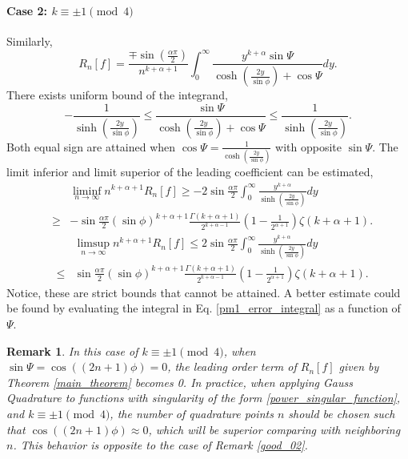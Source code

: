 \documentclass[11pt]{article}
\newtheorem{remark}{Remark}
\begin{document}
\paragraph{\bf{Case 2: $k\equiv \pm 1\pmod 4$}} Similarly,
\begin{equation}
        R_n[f] =\frac{\mp \sin(\frac{\alpha\pi}{2})}{ n^{k+\alpha+1}}  \int_{0}^{\infty}  \frac{  y^{k+\alpha} \sin \Psi }{\cosh\left(\frac{2y}{\sin\phi}\right) + \cos \Psi} dy. \label{pm1_error_integral}
\end{equation}
There exists uniform bound of the integrand,
\begin{equation}
    -\frac{1}{\sinh\left(\frac{2y}{\sin\phi}\right)} \leq \frac{ \sin \Psi }{\cosh\left(\frac{2y}{\sin\phi}\right)+\cos \Psi} \leq \frac{1}{\sinh\left(\frac{2y}{\sin\phi}\right)}.
\end{equation}
Both equal sign are attained when $\cos\Psi = \frac{1}{\cosh\left(\frac{2y}{\sin\phi}\right)}$ with opposite $\sin \Psi$. The limit inferior and limit superior of the leading coefficient can be estimated,
\begin{eqnarray}
    &&\liminf_{n \to \infty} n^{k+\alpha+1}R_n[f] \geq -2 \sin \frac{\alpha \pi}{2}  \int_0^\infty \frac{y^{k+\alpha} }{\sinh\left(\frac{2y}{\sin\phi}\right)} dy \nonumber\\
    &\geq& -\sin\frac{\alpha \pi}{2} (\sin \phi)^{k+\alpha+1}  \frac{\Gamma(k+\alpha+1)}{2^{k+\alpha-1}}(1-\frac{1}{2^{\alpha+1}}) \zeta(k+\alpha+1). \label{4lpm1_l}
\end{eqnarray}
\begin{eqnarray}
    &&\limsup_{n \to \infty} n^{k+\alpha+1}R_n[f] \leq 2 \sin \frac{\alpha \pi}{2}  \int_0^\infty \frac{y^{k+\alpha} }{\sinh\left(\frac{2y}{\sin\phi}\right)} dy \nonumber\\
    &\leq& \sin\frac{\alpha \pi}{2} (\sin \phi)^{k+\alpha+1}  \frac{\Gamma(k+\alpha+1)}{2^{k+\alpha-1}}(1-\frac{1}{2^{\alpha+1}}) \zeta(k+\alpha+1). \label{4lpm1_u}
\end{eqnarray}
Notice, these are strict bounds that cannot be attained. A better estimate could be found by evaluating the integral in Eq. \eqref{pm1_error_integral} as a function of $\Psi$.
\begin{remark}
    In this case of $k\equiv \pm 1\pmod 4$, when $\sin \Psi = \cos((2n+1)\phi) =0$, the leading order term of $R_n[f]$ given by Theorem \ref{main_theorem} becomes 0. In practice, when applying Gauss Quadrature to functions with singularity of the form \eqref{power_singular_function}, and $k\equiv \pm 1\pmod 4$, the number of quadrature points $n$ should be chosen such that $\cos((2n+1)\phi) \approx 0$, which will be superior comparing with neighboring $n$. This behavior is opposite to the case of Remark \ref{good_02}. \label{good_pm1}
\end{remark}
\end{document}
